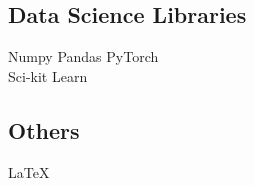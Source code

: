 \documentclass[letterpaper]{deedy-resume} %
\begin{document}
\begin{minipage}[t]{0.33\textwidth}
\sectionspace

\subsection{Data Science Libraries}
Numpy \textbullet{} Pandas \textbullet{} PyTorch \\
Sci-kit Learn \\

\sectionspace

\subsection{Others}
\LaTeX

\sectionspace %


\end{minipage} %
\hfill
%
%
\end{document}
